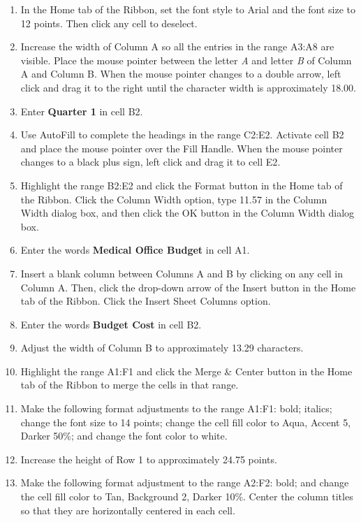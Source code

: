 \begin{enumerate}[resume]
	\item In the Home tab of the Ribbon, set the font style to Arial and the font size to 12 points. Then click any cell to deselect.
	\item Increase the width of Column \textsf{A} so all the entries in the range \textsf{A3:A8} are visible. Place the mouse pointer between the letter \textit{A} and letter \textit{B} of Column \textsf{A} and Column \textsf{B}. When the mouse pointer changes to a double arrow, left click and drag it to the right until the character width is approximately 18.00.
	\item Enter \textbf{Quarter 1} in cell \textsf{B2}.
	\item Use AutoFill to complete the headings in the range \textsf{C2:E2}. Activate cell \textsf{B2} and place the mouse pointer over the Fill Handle. When the mouse pointer changes to a black plus sign, left click and drag it to cell \textsf{E2}.
	\item Highlight the range \textsf{B2:E2} and click the Format button in the Home tab of the Ribbon. Click the Column Width option, type 11.57 in the Column Width dialog box, and then click the OK button in the Column Width dialog box.
	\item Enter the words \textbf{Medical Office Budget} in cell \textsf{A1}.
	\item Insert a blank column between Columns \textsf{A} and \textsf{B} by clicking on any cell in Column A. Then, click the drop-down arrow of the Insert button in the Home tab of the Ribbon. Click the Insert Sheet Columns option.
	\item Enter the words \textbf{Budget Cost} in cell \textsf{B2}.
	\item Adjust the width of Column \textsf{B} to approximately 13.29 characters.
	\item Highlight the range \textsf{A1:F1} and click the Merge \& Center button in the Home tab of the Ribbon to merge the cells in that range.
	\item Make the following format adjustments to the range \textsf{A1:F1}: bold; italics; change the font size to 14 points; change the cell fill color to Aqua, Accent 5, Darker 50\%; and change the font color to white.
	\item Increase the height of Row 1 to approximately 24.75 points.
	\item Make the following format adjustment to the range \textsf{A2:F2}: bold; and change the cell fill color to Tan, Background 2, Darker 10\%. Center the column titles so that they are horizontally centered in each cell.

\end{enumerate}
